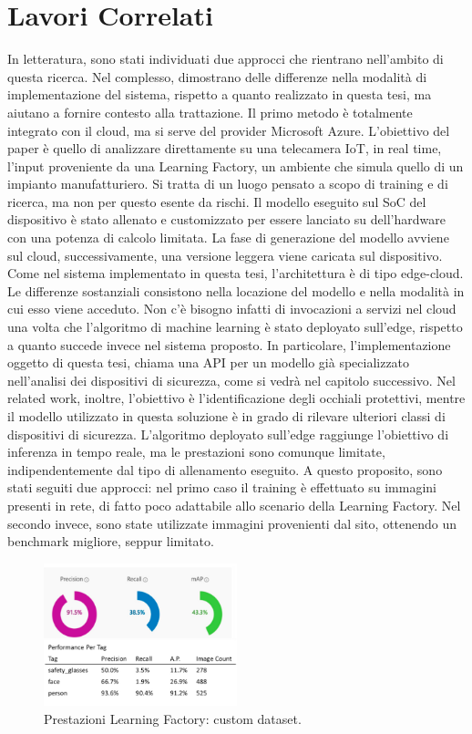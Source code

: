 \section{Lavori Correlati}

In letteratura, sono stati individuati due approcci che rientrano nell'ambito di questa ricerca. Nel complesso, dimostrano delle differenze nella modalità di implementazione del sistema, rispetto a quanto realizzato in questa tesi, ma aiutano a fornire contesto alla trattazione. Il primo metodo \cite{a7edgeppe} è totalmente integrato con il cloud, ma si serve del provider Microsoft Azure. L'obiettivo del paper è quello di analizzare direttamente su una telecamera IoT, in real time, l'input proveniente da una Learning Factory, un ambiente che simula quello di un impianto manufatturiero. Si tratta di un luogo pensato a scopo di training e di ricerca, ma non per questo esente da rischi. Il modello eseguito sul SoC del dispositivo è stato allenato e customizzato per essere lanciato su dell'hardware con una potenza di calcolo limitata. La fase di generazione del modello avviene sul cloud, successivamente, una versione leggera viene caricata sul dispositivo. Come nel sistema implementato in questa tesi, l'architettura è di tipo edge-cloud. Le differenze sostanziali consistono nella locazione del modello e nella modalità in cui esso viene acceduto. Non c'è bisogno infatti di invocazioni a servizi nel cloud una volta che l'algoritmo di machine learning è stato deployato sull'edge, rispetto a quanto succede invece nel sistema proposto. In particolare, l'implementazione oggetto di questa tesi, chiama una API per un modello già specializzato nell'analisi dei dispositivi di sicurezza, come si vedrà nel capitolo successivo. Nel related work, inoltre, l'obiettivo è l'identificazione degli occhiali protettivi, mentre il modello utilizzato in questa soluzione è in grado di rilevare ulteriori classi di dispositivi di sicurezza. L'algoritmo deployato sull'edge raggiunge l'obiettivo di inferenza in tempo reale, ma le prestazioni sono comunque limitate, indipendentemente dal tipo di allenamento eseguito. A questo proposito, sono stati seguiti due approcci: nel primo caso il training è effettuato su immagini presenti in rete, di fatto poco adattabile allo scenario della Learning Factory. Nel secondo invece, sono state utilizzate immagini provenienti dal sito, ottenendo un benchmark migliore, seppur limitato.

\begin{figure}[htbp]
    \centering
    \includegraphics[width=0.5\textwidth]{figures/relw1.png}
    \caption{Prestazioni Learning Factory: custom dataset.}
    \label{fig:relw1}
\end{figure}



